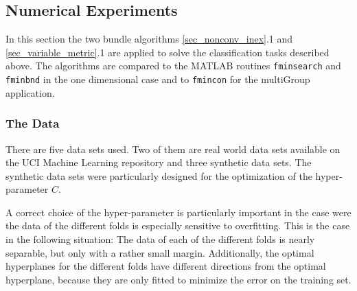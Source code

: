 



\subsection{Numerical Experiments}

In this section the two bundle algorithms \ref{sec_nonconv_inex}.1 and \ref{sec_variable_metric}.1 are applied to solve the classification tasks described above.
The algorithms are compared to the MATLAB routines \texttt{fminsearch} and \texttt{fminbnd} in the one dimensional case and to \texttt{fmincon} for the multiGroup application.


\subsubsection{The Data}
There are five data sets used. Two of them are real world data sets available on the UCI Machine Learning repository \cite{Lichman2013} and three synthetic data sets.
The synthetic data sets were particularly designed for the optimization of the hyper-parameter \(C\).

A correct choice of the hyper-parameter is particularly important in the case were the data of the different folds is especially sensitive to overfitting.
This is the case in the following situation: The data of each of the different folds is nearly separable, but only with a rather small margin. Additionally, the optimal hyperplanes for the different folds have different directions from the optimal hyperplane, because they are only fitted to minimize the error on the training set.

